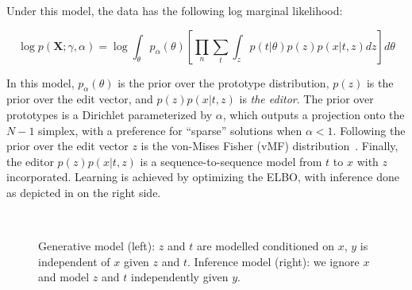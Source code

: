 Under this model, the data has the following log marginal likelihood:

\begin{equation}
    \log p(\bm{X} ; \gamma, \alpha) =
    \log \int_\theta p_\alpha (\theta)
    \left[ \prod_n \sum_{t} \int_{z}
    p(t | \theta) p(z) p(x | t, z)
    dz \right] d\theta
\end{equation}

In this model, $p_\alpha(\theta)$ is the prior over the prototype
distribution, $p(z)$ is the prior over the edit vector, and
$p(z) p(x | t, z)$ is {\it the editor}.
The prior over prototypes is a Dirichlet parameterized by $\alpha$,
which outputs a projection onto the $N-1$ simplex, with a preference
for ``sparse'' solutions when $\alpha<1$. Following
\citet{guu2018GeneratingSentencesEditing} the prior over the edit
vector $z$ is the von-Mises Fisher (vMF)
distribution~\citep{s-vae18}. Finally, the editor
$p(z) p(x | t, z)$ is a
sequence-to-sequence model from $t$ to $x$ with
$z$ incorporated. Learning is achieved by optimizing the ELBO,
with inference done as depicted in
 on the right side.

\begin{figure}[t]
    \centering
    
    ~

    \caption{Generative model (left): $z$ and $t$ are modelled
    conditioned on $x$, $y$ is independent of $x$ given $z$ and $t$.
    Inference model (right): we ignore $x$ and model $z$ and $t$
    independently given $y$.} \label{fig:conditional}
\end{figure}

